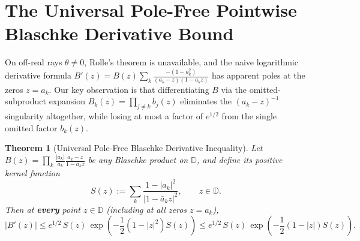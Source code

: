 \documentclass[11pt,reqno]{amsart}
\newtheorem{thm}{Theorem}[section]
\numberwithin{equation}{section}
\newcommand{\D}{\mathbb{D}}
\begin{document}
\section{The Universal Pole-Free Pointwise Blaschke Derivative Bound} \label{sec_pole_free}

On off-real rays $\theta \ne 0$, Rolle's theorem is unavailable, and the naive logarithmic derivative formula $B'(z) = B(z) \sum_{k} \frac{-(1 - a_k^2)}{(a_k - z)(1 - a_k z)}$ has apparent poles at the zeros $z = a_k$. Our key observation is that differentiating $B$ via the omitted-subproduct expansion $B_k(z) = \prod_{j \ne k} b_j(z)$ eliminates the $(a_k - z)^{-1}$ singularity altogether, while losing at most a factor of $e^{1/2}$ from the single omitted factor $b_k(z)$.

\begin{thm}[Universal Pole-Free Blaschke Derivative Inequality] \label{thm_pole_free}
Let $B(z) = \prod_{k} \frac{|a_k|}{a_k} \frac{a_k - z}{1 - \bar{a}_k z}$ be any Blaschke product on $\D$, and define its positive kernel function
\begin{equation} \label{eq_Sz_def}
  S(z) := \sum_k \frac{1 - |a_k|^2}{|1 - \bar{a}_k z|^2}, \qquad z \in \D.
\end{equation}
Then at \textbf{every} point $z \in \D$ (including at all zeros $z = a_k$),
\begin{equation} \label{eq_universal_deriv}
  |B'(z)| \le e^{1/2} \, S(z) \, \exp\!\left(-\frac{1}{2}(1 - |z|^2) S(z)\right)
  \le e^{1/2} \, S(z) \, \exp\!\left(-\frac{1}{2}(1 - |z|) S(z)\right).
\end{equation}
\end{thm}
\end{document}
